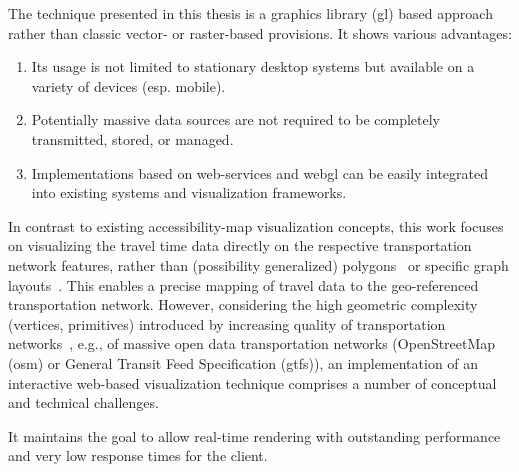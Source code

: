     The technique presented in this thesis is a graphics library (\acrshort{gl})
    based approach rather than classic vector- or raster-based provisions.
    It shows various advantages:\par

    \begin{enumerate}[\label=({A}1)]
      \item Its usage is not limited to stationary desktop systems but available
        on a variety of devices (esp. mobile).
      \item Potentially massive data sources are not required to be completely
        transmitted, stored, or managed.
      \item Implementations based on web-services and \acrshort{webgl} can be
        easily integrated into existing systems and visualization frameworks.
    \end{enumerate}

    In contrast to existing accessibility-map visualization concepts, this work
    focuses on visualizing the travel time data directly on the respective
    transportation network features, rather than (possibility generalized)
    polygons~\cite{Glander2010} or specific graph layouts~\cite{Krause2012}.
    This enables a precise mapping of travel data to the geo-referenced
    transportation network. However, considering the high geometric complexity
    (vertices, primitives) introduced by increasing quality of transportation
    networks~\cite{Zielstra2010}, e.g., of massive open data transportation
    networks (OpenStreetMap (\acrshort{osm}) or General Transit Feed
    Specification (\acrshort{gtfs})),
    an implementation of an interactive web-based visualization technique
    comprises a number of conceptual and technical challenges.\par

    It maintains the goal to allow real-time rendering with outstanding
    performance and very low response times for the client.\par

